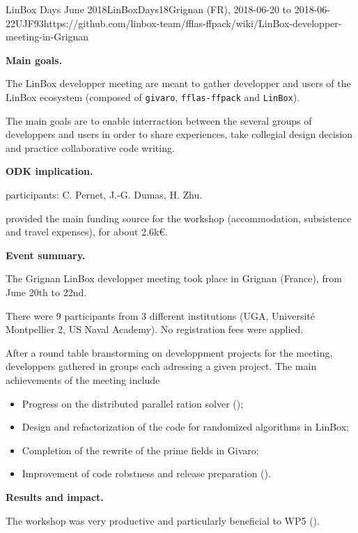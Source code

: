 \begin{event}{LinBox Days June 2018}{LinBoxDays18}{Grignan (FR),
2018-06-20 to 2018-06-22}{UJF}{9}{3}{https://github.com/linbox-team/fflas-ffpack/wiki/LinBox-developper-meeting-in-Grignan}

\textbf{Main goals.}

The LinBox developper meeting are meant to gather developper and users of the
LinBox ecosystem (composed of \texttt{givaro}, \texttt{fflas-ffpack} and
\texttt{LinBox}).

The main goals are to enable interraction between the several groups of
developpers and users in order to share experiences, take collegial design
decision and practice collaborative code writing.

\textbf{ODK implication.} 

\ODK participants: C. Pernet, J.-G. Dumas, H. Zhu.

\ODK provided the main funding source for the workshop (accommodation,
subsistence and travel expenses), for about 2.6k\euro.

\textbf{Event summary.} 

The Grignan LinBox developper meeting took place in Grignan (France), from June
20th to 22nd.

There were 9 participants from 3 different institutions (UGA, Université
Montpellier 2, US Naval Academy).
No registration fees were applied.

After a round table branstorming on developpment projects for the meeting,
developpers gathered in groups each adressing a given project.
The main achievements of the meeting include
\begin{itemize}
\item Progress on the distributed parallel ration solver ();
\item Design and refactorization of the code for randomized algorithms in LinBox;
\item Completion of the rewrite of the prime fields in Givaro;
\item Improvement of code robstness and release preparation ().
\end{itemize}


\textbf{Results and impact.} 

The workshop was very productive and particularly beneficial to WP5 ().
\end{event}
